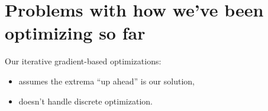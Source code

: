 \section{Problems with how we've been optimizing so far}

\begin{frame}

Our iterative gradient-based optimizations:
\begin{itemize}
\item assumes the extrema ``up ahead'' is our solution,
\item doesn't handle discrete optimization.
\end{itemize}

\end{frame}
